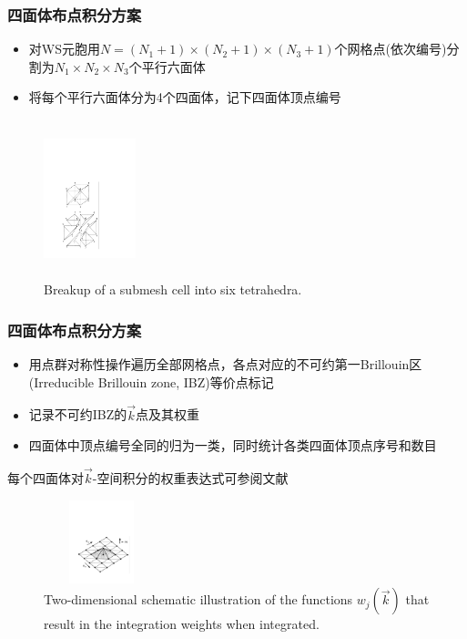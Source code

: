 \documentclass[cjk,slidestop,compress,mathserif,blue]{beamer}
\begin{document}
\frame
{
\frametitle{四面体布点积分方案}
\begin{itemize}
\setlength{\itemsep}{5pt}
	\item 对\textrm{WS}元胞用$N=(N_1+1)\times(N_2+1)\times(N_3+1)$个网格点(依次编号)分割为$N_1\times N_2\times N_3$个平行六面体
	\item 将每个平行六面体分为4个四面体，记下四面体顶点编号
\end{itemize}
\begin{figure}[h!]
\centering
\hspace*{-10pt}
\vspace*{-10pt}
\includegraphics[height=1.8in,width=1.05in,viewport=120 60 360 505,clip]{Figures/submesh_Tetra.pdf}
\caption{\small \textrm{Breakup of a submesh cell into six tetrahedra.}}%
\label{Tetrahedron_split}
\end{figure}

}
\frame
{
\frametitle{四面体布点积分方案}
\begin{itemize}
\setlength{\itemsep}{10pt}
	\item 用点群对称性操作遍历全部网格点，各点对应的不可约第一\textrm{Brillouin}区\textrm{(Irreducible Brillouin zone, IBZ)}等价点标记
	\item 记录不可约\textrm{IBZ}的$\vec k$点及其权重
	\item 四面体中顶点编号全同的归为一类，同时统计各类四面体顶点序号和数目
\end{itemize}
每个四面体对$\vec k$-空间积分的权重表达式可参阅文献\cite{PRB49-16233_1994}
\begin{figure}[h!]
\centering
\includegraphics[height=0.95in,width=1.32in,viewport=85 99 560 460,clip]{Figures/dimen_Tetra.pdf}
\caption{\small \textrm{Two-dimensional schematic illustration of the functions $w_j(\vec k)$ that result in the integration weights when integrated.}}%
\label{Tetrahedron_weight}
\end{figure}
}
\end{document}
